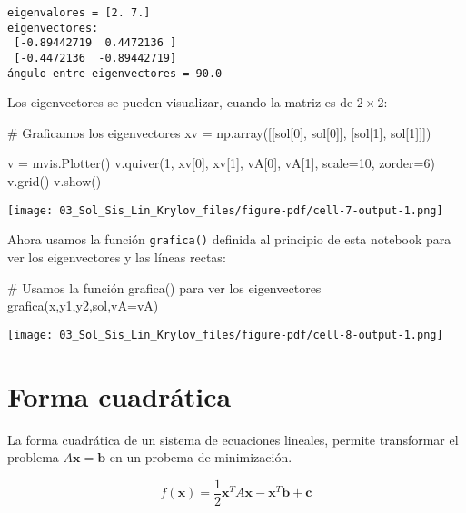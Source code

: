 \documentclass[
  letterpaper,
  DIV=11,
  numbers=noendperiod]{scrreprt}
\newenvironment{Shaded}{\begin{snugshade}}{\end{snugshade}}
\newcommand{\CommentTok}[1]{\textcolor[rgb]{0.37,0.37,0.37}{#1}}
\newcommand{\DecValTok}[1]{\textcolor[rgb]{0.68,0.00,0.00}{#1}}
\newcommand{\NormalTok}[1]{\textcolor[rgb]{0.00,0.23,0.31}{#1}}
\newcommand{\OperatorTok}[1]{\textcolor[rgb]{0.37,0.37,0.37}{#1}}
\begin{document}
\begin{verbatim}
eigenvalores = [2. 7.]
eigenvectores:
 [-0.89442719  0.4472136 ] 
 [-0.4472136  -0.89442719]
ángulo entre eigenvectores = 90.0
\end{verbatim}

Los eigenvectores se pueden visualizar, cuando la matriz es de
\(2\times2\):

\begin{Shaded}
\begin{Highlighting}[]
\CommentTok{\# Graficamos los eigenvectores}
\NormalTok{xv }\OperatorTok{=}\NormalTok{ np.array([[sol[}\DecValTok{0}\NormalTok{], sol[}\DecValTok{0}\NormalTok{]],}
\NormalTok{               [sol[}\DecValTok{1}\NormalTok{], sol[}\DecValTok{1}\NormalTok{]]])}

\NormalTok{v }\OperatorTok{=}\NormalTok{ mvis.Plotter() }
\NormalTok{v.quiver(}\DecValTok{1}\NormalTok{, xv[}\DecValTok{0}\NormalTok{], xv[}\DecValTok{1}\NormalTok{], vA[}\DecValTok{0}\NormalTok{], vA[}\DecValTok{1}\NormalTok{], scale}\OperatorTok{=}\DecValTok{10}\NormalTok{, zorder}\OperatorTok{=}\DecValTok{6}\NormalTok{)}
\NormalTok{v.grid()}
\NormalTok{v.show()}
\end{Highlighting}
\end{Shaded}

\texttt{[image: 03\_Sol\_Sis\_Lin\_Krylov\_files/figure-pdf/cell-7-output-1.png]}

Ahora usamos la función \texttt{grafica()} definida al principio de esta
notebook para ver los eigenvectores y las líneas rectas:

\begin{Shaded}
\begin{Highlighting}[]
\CommentTok{\# Usamos la función grafica() para ver los eigenvectores}
\NormalTok{grafica(x,y1,y2,sol,vA}\OperatorTok{=}\NormalTok{vA)}
\end{Highlighting}
\end{Shaded}

\texttt{[image: 03\_Sol\_Sis\_Lin\_Krylov\_files/figure-pdf/cell-8-output-1.png]}

\section{Forma cuadrática}\label{forma-cuadruxe1tica}

La forma cuadrática de un sistema de ecuaciones lineales, permite
transformar el problema \(A \mathbf{x} = \mathbf{b}\) en un probema de
minimización.

\[ f(\mathbf{x}) = \dfrac{1}{2} \mathbf{x}^T A \mathbf{x} - \mathbf{x}^T \mathbf{b} + \mathbf{c} \]
\end{document}
